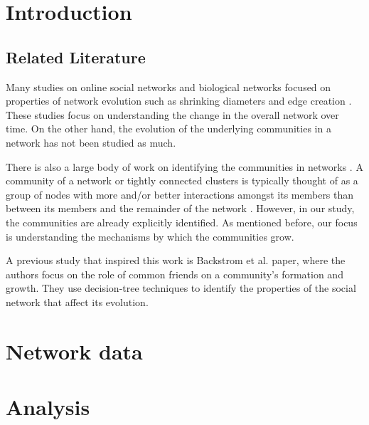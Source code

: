\documentclass{sig-alternate}
\begin{document}
\section{Introduction}



\subsection{Related Literature}
Many studies on online social networks and biological
networks focused on properties of network evolution such as shrinking 
diameters and edge creation \cite{kumar_tomkins, LKF, micro_evol}.
These studies focus on understanding the change in the overall
network over time. On the other hand, the evolution of the 
underlying communities in a network has not been studied as much. 

There is also a large body of work on identifying the communities in 
networks \cite{newman, danon, www10}.
A community of a network or tightly connected clusters is typically thought of
as a group of nodes with more and/or better interactions amongst
its members than between its members and the remainder of the
network \cite{define_comm}. However, in our study, the communities are 
already explicitly identified. As mentioned before, our focus is understanding 
the mechanisms by which the communities grow.

A previous study that inspired this work is  Backstrom
et al. \cite{group_formation} paper, where the authors focus on the role of common
friends on a community's formation and growth. They use decision-tree techniques
to identify the properties of the social network that affect its evolution.


\section{Network data}



 


\section{Analysis}
\end{document}
